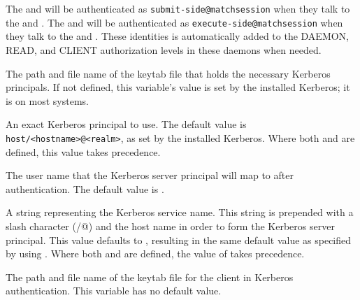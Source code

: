 \begin{description}
  The  and  will be authenticated as
  \verb|submit-side@matchsession| when they talk to the  and
  .  The  and  will be authenticated as
  \verb|execute-side@matchsession| when they talk to the  and
  .
  These identities is automatically added to the DAEMON, READ, and CLIENT
  authorization levels in these daemons when needed.

\label{param:KerberosServerKeytab}
\item[\Macro{KERBEROS\_SERVER\_KEYTAB}]
  The path and file name of the keytab file that holds the necessary Kerberos
  principals.
  If not defined, this variable's value is set by the installed Kerberos;
  it is  on most systems.

\label{param:KerberosServerPrincipal}
\item[\Macro{KERBEROS\_SERVER\_PRINCIPAL}]
  An exact Kerberos principal to use.
  The default value is \verb$host/<hostname>@<realm>$, as set by the
  installed Kerberos.
  Where both  and
   are defined, this value takes
  precedence.

\label{param:KerberosServerUser}
\item[\Macro{KERBEROS\_SERVER\_USER}]
  The user name that the Kerberos server principal will map to after
  authentication.
  The default value is \verb@condor@.

\label{param:KerberosServerService}
\item[\Macro{KERBEROS\_SERVER\_SERVICE}]
  A string representing the Kerberos service name.
  This string is prepended with a slash character (\verb@/@) and the host name
  in order to form the Kerberos server principal.
  This value defaults to \verb@host@, resulting in the same default value
  as specified by using .
  Where both  and
   are defined, the value of
   takes precedence.


\label{param:KerberosClientKeytab}
\item[\Macro{KERBEROS\_CLIENT\_KEYTAB}]
  The path and file name of the keytab file for the client
  in Kerberos authentication.
  This variable has no default value.

\end{description}

